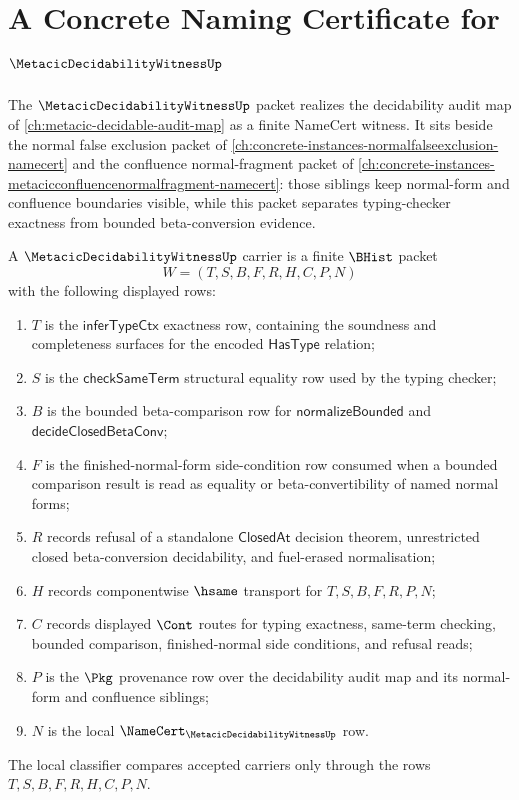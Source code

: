 \chapter{A Concrete Naming Certificate for $\MetacicDecidabilityWitnessUp$}
\label{ch:concrete-instances-metacicdecidabilitywitness-namecert}

The $\MetacicDecidabilityWitnessUp$ packet realizes the decidability audit map of \autoref{ch:metacic-decidable-audit-map} as a finite NameCert witness. It sits beside the normal false exclusion packet of \autoref{ch:concrete-instances-normalfalseexclusion-namecert} and the confluence normal-fragment packet of \autoref{ch:concrete-instances-metacicconfluencenormalfragment-namecert}: those siblings keep normal-form and confluence boundaries visible, while this packet separates typing-checker exactness from bounded beta-conversion evidence.

\begin{definition}
\label{def:metacic-decidability-witness-carrier}
A $\MetacicDecidabilityWitnessUp$ carrier is a finite $\BHist$ packet
$$
W=(T,S,B,F,R,H,C,P,N)
$$
with the following displayed rows:
\begin{enumerate}
\item $T$ is the $\mathsf{inferTypeCtx}$ exactness row, containing the soundness and completeness surfaces for the encoded $\mathsf{HasType}$ relation;
\item $S$ is the $\mathsf{checkSameTerm}$ structural equality row used by the typing checker;
\item $B$ is the bounded beta-comparison row for $\mathsf{normalizeBounded}$ and $\mathsf{decideClosedBetaConv}$;
\item $F$ is the finished-normal-form side-condition row consumed when a bounded comparison result is read as equality or beta-convertibility of named normal forms;
\item $R$ records refusal of a standalone $\mathsf{ClosedAt}$ decision theorem, unrestricted closed beta-conversion decidability, and fuel-erased normalisation;
\item $H$ records componentwise $\hsame$ transport for $T,S,B,F,R,P,N$;
\item $C$ records displayed $\Cont$ routes for typing exactness, same-term checking, bounded comparison, finished-normal side conditions, and refusal reads;
\item $P$ is the $\Pkg$ provenance row over the decidability audit map and its normal-form and confluence siblings;
\item $N$ is the local $\NameCert_{\MetacicDecidabilityWitnessUp}$ row.
\end{enumerate}
The local classifier compares accepted carriers only through the rows $T,S,B,F,R,H,C,P,N$.
\end{definition}

